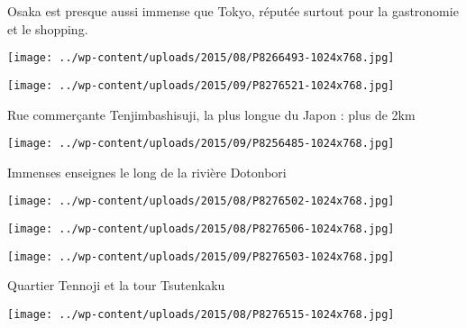  

 Osaka est presque aussi immense que Tokyo, réputée surtout pour la gastronomie et le shopping. 

 

\begin{center} \texttt{[image: ../wp-content/uploads/2015/08/P8266493-1024x768.jpg]} \end{center}

 

 

\begin{center} \texttt{[image: ../wp-content/uploads/2015/09/P8276521-1024x768.jpg]} \end{center}

 

 Rue commerçante Tenjimbashisuji, la plus longue du Japon : plus de 2km 

 

\begin{center} \texttt{[image: ../wp-content/uploads/2015/09/P8256485-1024x768.jpg]} \end{center}

 

 Immenses enseignes le long de la rivière Dotonbori 

 

\begin{center} \texttt{[image: ../wp-content/uploads/2015/08/P8276502-1024x768.jpg]} \end{center}

 

 

\begin{center} \texttt{[image: ../wp-content/uploads/2015/08/P8276506-1024x768.jpg]} \end{center}

 

 

\begin{center} \texttt{[image: ../wp-content/uploads/2015/09/P8276503-1024x768.jpg]} \end{center}

 

 Quartier Tennoji et la tour Tsutenkaku 

 

\begin{center} \texttt{[image: ../wp-content/uploads/2015/08/P8276515-1024x768.jpg]} \end{center}

